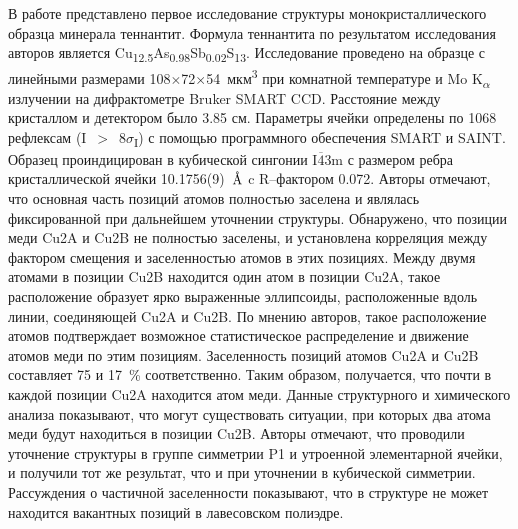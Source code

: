 В работе \cite{Makovicky2005} представлено первое исследование структуры монокристаллического образца минерала теннантит. Формула теннантита по результатом исследования авторов является Cu\textsubscript{12.5}As\textsubscript{0.98}Sb\textsubscript{0.02}S\textsubscript{13}. Исследование проведено на образце с линейными размерами 108$\times$72$\times$54~мкм\textsuperscript{3} при комнатной температуре и Mo K\textsubscript{$\alpha$} излучении на дифрактометре Bruker SMART CCD. Расстояние между кристаллом и детектором было 3.85 см. Параметры ячейки определены по 1068 рефлексам (I~$>$~8$\sigma$\textsubscript{I}) с помощью программного обеспечения SMART и SAINT. Образец проиндицирован в кубической сингонии I$\overline{\!4}$3m с размером ребра кристаллической ячейки 10.1756(9)~$\mbox{\normalfont\AA}$ c R--фактором 0.072. Авторы отмечают, что основная часть позиций атомов полностью заселена и являлась фиксированной при дальнейшем уточнении структуры. Обнаружено, что позиции меди Cu2A и Cu2B не полностью заселены, и установлена корреляция между фактором смещения и заселенностью атомов в этих позициях. Между двумя атомами в позиции Cu2B находится один атом в позиции Cu2A, такое расположение образует ярко выраженные эллипсоиды, расположенные вдоль линии, соединяющей Cu2A и Cu2B.  По мнению авторов, такое расположение атомов подтверждает возможное статистическое распределение и движение атомов меди  по этим позициям. Заселенность позиций атомов Cu2A и Cu2B составляет 75 и 17~\% соответственно. Таким образом, получается, что почти в каждой позиции Cu2A находится атом меди. Данные структурного и химического анализа показывают, что могут существовать ситуации, при которых два атома меди будут находиться в позиции  Cu2B. Авторы отмечают, что проводили уточнение структуры в группе симметрии P1 и утроенной элементарной ячейки, и получили тот же результат, что и при уточнении в кубической симметрии. Рассуждения о частичной заселенности показывают, что в структуре не может находится вакантных позиций в лавесовском полиэдре.



